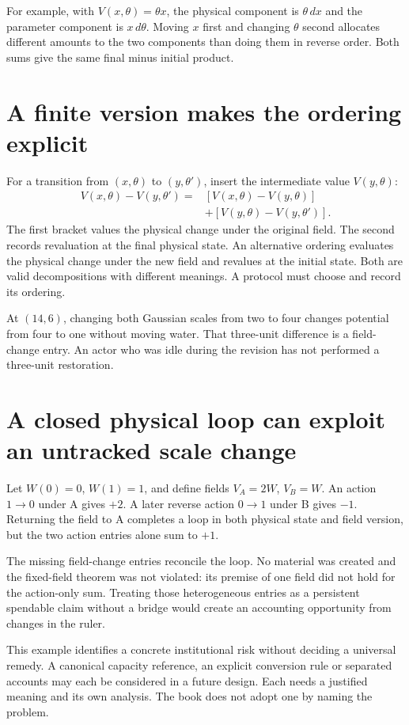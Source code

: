 For example, with $V(x,\theta)=\theta x$, the physical component is $\theta\,dx$ and the parameter component is $x\,d\theta$. Moving $x$ first and changing $\theta$ second allocates different amounts to the two components than doing them in reverse order. Both sums give the same final minus initial product.

\section{A finite version makes the ordering explicit}
For a transition from $(x,\theta)$ to $(y,\theta')$, insert the intermediate value $V(y,\theta)$:
\begin{align}\label{eq:field-split}
 V(x,\theta)-V(y,\theta')
 ={}&[V(x,\theta)-V(y,\theta)]\nonumber\\
   &+[V(y,\theta)-V(y,\theta')].
\end{align}
The first bracket values the physical change under the original field. The second records revaluation at the final physical state. An alternative ordering evaluates the physical change under the new field and revalues at the initial state. Both are valid decompositions with different meanings. A protocol must choose and record its ordering.

At $(14,6)$, changing both Gaussian scales from two to four changes potential from four to one without moving water. That three-unit difference is a field-change entry. An actor who was idle during the revision has not performed a three-unit restoration.

\section{A closed physical loop can exploit an untracked scale change}
Let $W(0)=0$, $W(1)=1$, and define fields $V_A=2W$, $V_B=W$. An action $1\to0$ under A gives $+2$. A later reverse action $0\to1$ under B gives $-1$. Returning the field to A completes a loop in both physical state and field version, but the two action entries alone sum to $+1$.

The missing field-change entries reconcile the loop. No material was created and the fixed-field theorem was not violated: its premise of one field did not hold for the action-only sum. Treating those heterogeneous entries as a persistent spendable claim without a bridge would create an accounting opportunity from changes in the ruler.

This example identifies a concrete institutional risk without deciding a universal remedy. A canonical capacity reference, an explicit conversion rule or separated accounts may each be considered in a future design. Each needs a justified meaning and its own analysis. The book does not adopt one by naming the problem.

